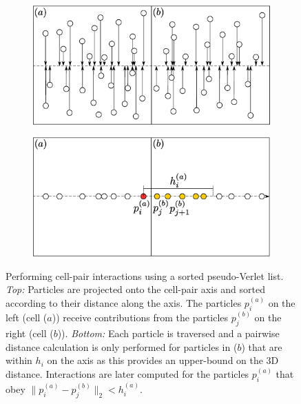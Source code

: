\documentclass{IOS-Book-Article}
\begin{document}
\begin{figure}
  \centering
  \begin{subfigure}[b]{0.55\textwidth}
    \includegraphics[width=1\linewidth]{Figures/parts_sorted.eps}
  \end{subfigure}

  \begin{subfigure}[b]{0.55\textwidth}
    \includegraphics[width=1\linewidth]{Figures/parts_on_axis.eps}
  \end{subfigure}

  \caption{Performing cell-pair interactions using a sorted pseudo-Verlet list. \textit{Top:} Particles are projected onto the cell-pair axis and sorted according to their distance along the axis. The particles $p_i^{(a)}$ on the left (cell ($a$)) receive contributions from the particles $p_j^{(b)}$ on the right (cell ($b$)). \textit{Bottom:} Each particle is traversed and a pairwise distance calculation is only performed for particles in ($b$) that are within $h_i$ on the axis as this provides an upper-bound on the 3D distance. Interactions are later computed for the particles $p_i^{(a)}$ that obey $ \|p^{(a)}_i - p^{(b)}_j\|_2 < h_i^{(a)}$.}
  \label{fig:sort_parts}
\end{figure}
\end{document}
